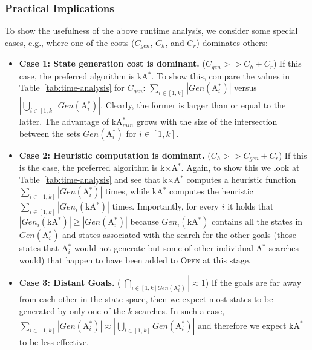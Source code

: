 \documentclass{aicom2e}
\newcommand{\astar}{A$^*$}
\newcommand{\kastar}{kA$^*$}
\newcommand{\kastarmin}{kA$^*_{min}$}
\newcommand{\kxastar}{k$\times$A$^*$}
\newcommand{\astari}[1]{A$^*_#1$}
\newcommand{\open}{\textsc{Open}}
\begin{document}
\subsubsection{Practical Implications}
To show the usefulness of the above runtime analysis, we  consider some special
cases, e.g.,  where one of the costs ($C_{gen}$, $C_{h}$, and $C_{r}$) dominates others:
\begin{itemize}
    \item {\bf Case 1: State generation cost is dominant.} ($C_{gen}>>C_{h}+C_r$)
    If this case, the preferred algorithm is \kastar{}. To show this,
    compare the values in Table~\ref{tab:time-analysis} for $C_{gen}$: $\sum_{i\in[1,k]} |Gen(\text{\astari{i}})|$
    versus $|\bigcup_{i\in[1,k]} Gen(\text{\astari{i}})|$. Clearly, the former is larger than or equal to the latter.
    The advantage of \kastarmin{} grows with the size of the intersection between the sets $Gen(\text{\astari{i}})$ for $i\in[1,k]$.

    \item {\bf Case 2: Heuristic computation is dominant.} ($C_{h}>>C_{gen}+C_r$)
    If this is the case, the preferred algorithm is \kxastar{}. Again, to show this we look at
     Table~\ref{tab:time-analysis} and see that \kxastar{} computes a heuristic function
    $\sum_{i\in[1,k]} |Gen(\text{\astari{i}})|$ times, while
    \kastar{} computes the heuristic $\sum_{i\in[1,k]} |Gen_i(\text{\kastar})|$ times.
    Importantly, for every $i$ it holds that $|Gen_i(\text{\kastar})|\geq |Gen(\text{\astari{i}})|$
    because $Gen_i(\text{\kastar})$ contains all the states in $Gen(\text{\astari{i}})$
    and states associated with the search for the other goals
    (those states that \astari{i} would not generate but some of other individual \astar{} searches would) that happen to have been added to \open{} at this stage.

   \item {\bf Case 3: Distant Goals.} ($|\bigcap_{i\in[1,k] Gen(\text{\astari{i}})}|\approx 1$)
   If the goals are far away from each other in the state space,
   then we expect most states to be generated by only one of the $k$ searches.
   In such a case, $\sum_{i\in[1,k]}|Gen(\text{\astari{i}})|\approx |\bigcup\limits_{i\in[1,k]} Gen(\text{\astari{i}})|$
   and therefore we expect \kastar{} to be less effective.
\end{itemize}
\end{document}
